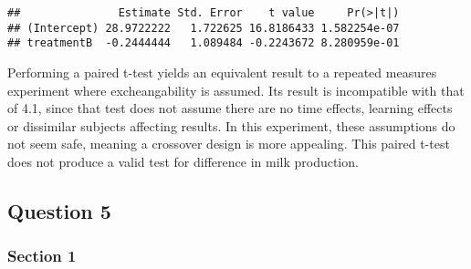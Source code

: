 \documentclass[]{article}
\begin{document}
\begin{verbatim}
##               Estimate Std. Error    t value     Pr(>|t|)
## (Intercept) 28.9722222   1.722625 16.8186433 1.582254e-07
## treatmentB  -0.2444444   1.089484 -0.2243672 8.280959e-01
\end{verbatim}

Performing a paired t-test yields an equivalent result to a repeated
measures experiment where excheangability is assumed. Its result is
incompatible with that of 4.1, since that test does not assume there are
no time effects, learning effects or dissimilar subjects affecting
results. In this experiment, these assumptions do not seem safe, meaning
a crossover design is more appealing. This paired t-test does not
produce a valid test for difference in milk production.

\subsection{Question 5}\label{question-5}

\subsubsection{Section 1}\label{section-1-2}
\end{document}
